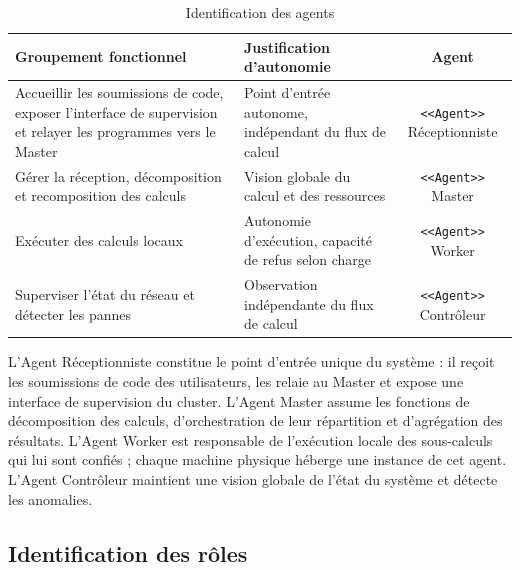 \documentclass[12pt,a4paper]{report}
\begin{document}
\begin{table}[H]
\centering
\renewcommand{\arraystretch}{1.3}
\begin{tabular}{|p{4.5cm}|p{5.5cm}|c|}
\hline
\textbf{Groupement fonctionnel} & \textbf{Justification d'autonomie} & \textbf{Agent} \\
\hline
Accueillir les soumissions de code, exposer l'interface de supervision et relayer les programmes vers le Master & Point d'entrée autonome, indépendant du flux de calcul & \texttt{<<Agent>>} Réceptionniste \\
\hline
Gérer la réception, décomposition et recomposition des calculs & Vision globale du calcul et des ressources & \texttt{<<Agent>>} Master \\
\hline
Exécuter des calculs locaux & Autonomie d'exécution, capacité de refus selon charge & \texttt{<<Agent>>} Worker \\
\hline
Superviser l'état du réseau et détecter les pannes & Observation indépendante du flux de calcul & \texttt{<<Agent>>} Contrôleur \\
\hline
\end{tabular}
\caption{Identification des agents}
\label{tab:identification_agents}
\end{table}

L'Agent Réceptionniste constitue le point d'entrée unique du système : il reçoit les soumissions de code des utilisateurs, les relaie au Master et expose une interface de supervision du cluster. L'Agent Master assume les fonctions de décomposition des calculs, d'orchestration de leur répartition et d'agrégation des résultats. L'Agent Worker est responsable de l'exécution locale des sous-calculs qui lui sont confiés ; chaque machine physique héberge une instance de cet agent. L'Agent Contrôleur maintient une vision globale de l'état du système et détecte les anomalies.

\subsection{Identification des rôles}
\end{document}
